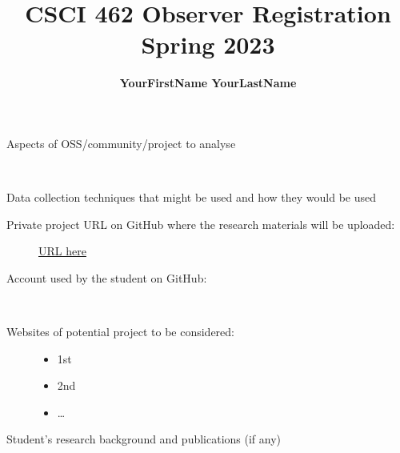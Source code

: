 \documentclass[runningheads]{llncs}
\begin{document}
%
\title{CSCI 462 Observer Registration\\Spring 2023}
%
\author{\textbf{YourFirstName YourLastName}} %
%
%
%
\maketitle
%
\begin{description}
  \item[Aspects of OSS/community/project to analyse]\mbox{}\\
\end{description}
\begin{description}
  \item[Data collection techniques that might be used and how they would be used] 
\end{description}
\begin{description}
  \item[Private project URL on GitHub where the research materials will be uploaded:]\mbox{}
      \url{URL here} %
  \item[Account used by the student on GitHub:]\mbox{}\\
  \item[Websites of potential project to be considered:]\mbox{}
     \begin{itemize}
        \item 1st %
        \item 2nd %
        \item\dots  %
     \end{itemize}
\end{description}
\begin{description}
  \item[Student's research background and publications (if any)]\mbox{}\\
\end{description}
\end{document}

